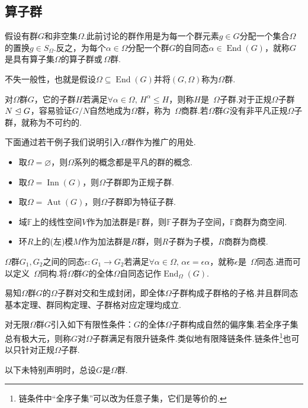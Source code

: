 \subsection{算子群}
假设有群$G$和非空集$\Omega$.此前讨论的群作用是为每一个群元素$g\in G$分配一个集合$\Omega$的置换$g\in S_{\Omega}$.反之，为每个$\alpha\in\Omega$分配一个群$G$的自同态$\alpha\in\operatorname*{End}(G)$，就称$G$是具有算子集$\Omega$的{\heiti 算子群}或\,{\heiti $\Omega$群}.

不失一般性，也就是假设$\Omega\subseteq\operatorname*{End}(G)$并将$(G,\Omega)$称为$\Omega$群.

对$\Omega$群$G$，它的子群$H$若满足$\forall\alpha\in\Omega,\,H^\alpha\le H$，则称$H$是 \,{\heiti $\Omega$子群}.对于正规$\Omega$子群$N\trianglelefteq G$，容易验证$G/N$自然地成为$\Omega$群，称为 \,{\heiti $\Omega$商群}.若$\Omega$群$G$没有非平凡正规$\Omega$子群，就称为{\heiti 不可约的}.

下面通过若干例子我们说明引入$\Omega$群作为推广的用处.
\begin{itemize}
	\item 取$\Omega=\varnothing$，则$\Omega$系列的概念都是平凡的群的概念.
	\item 取$\Omega=\operatorname*{Inn}(G)$，则$\Omega$子群即为正规子群.
	\item 取$\Omega=\operatorname*{Aut}(G)$，则$\Omega$子群即为特征子群.
	\item 域$\mathbb{F}$上的线性空间$V$作为加法群是$\mathbb{F}$群，则$\mathbb{F}$子群为子空间，$\mathbb{F}$商群为商空间.
	\item 环$R$上的(左)模$M$作为加法群是$R$群，则$R$子群为子模，$R$商群为商模.
\end{itemize}

$\Omega$群$G_1,G_2$之间的同态$\epsilon\colon G_1\to G_2$若满足$\forall\alpha\in\Omega,\,\alpha\epsilon=\epsilon\alpha$，就称$\epsilon$是 \,{\heiti $\Omega$同态}.进而可以定义 \,{\heiti $\Omega$同构}.将$\Omega$群$G$的全体$\Omega$自同态记作$\operatorname*{End}_\Omega(G)$.

易知$\Omega$群$G$的$\Omega$子群对交和生成封闭，即全体$\Omega$子群构成子群格的子格.并且群同态基本定理、群同构定理、子群格对应定理均成立.

\medskip 对无限$\Omega$群$G$引入如下有限性条件：$G$的全体$\Omega$子群构成自然的偏序集.若全序子集总有极大元，则称$G$对$\Omega$子群满足{\heiti 有限升链条件}.类似地{\heiti 有限降链条件}.链条件\footnote{链条件中“全序子集”可以改为任意子集，它们是等价的.}也可以只针对正规$\Omega$子群.

\medskip 以下未特别声明时，总设$G$是$\Omega$群.

